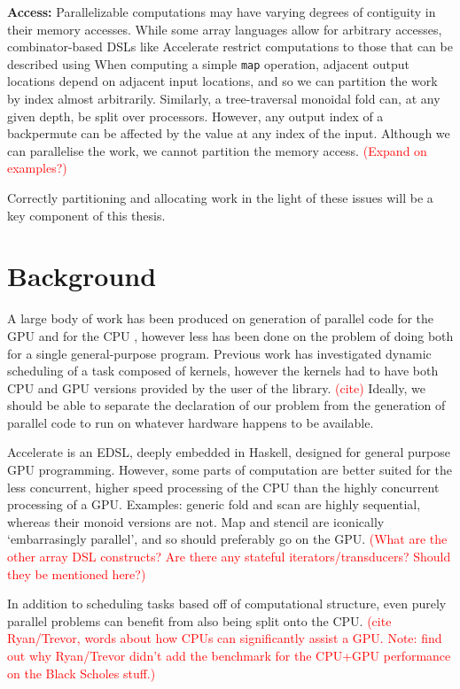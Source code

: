 \documentclass[a4paper,12pt]{article}
\newcommand{\red}[1]{\textcolor{red}{#1}}
\begin{document}
\begin{multicols}{2}
\textbf{Access:} Parallelizable computations may have varying degrees of contiguity in their memory accesses. While some array languages allow for arbitrary accesses, combinator-based DSLs like Accelerate restrict computations to those that can be described using When computing a simple \texttt{map} operation, adjacent output locations depend on adjacent input locations, and so we can partition the work by index almost arbitrarily. Similarly, a tree-traversal monoidal fold can, at any given depth, be split over processors. However, any output index of a backpermute can be affected by the value at any index of the input. Although we can parallelise the work, we cannot partition the memory access. \red{(Expand on examples?)}

Correctly partitioning and allocating work in the light of these issues will be a key component of this thesis.

\section{Background}

A large body of work has been produced on generation of parallel code for the GPU and for the CPU \citep{lee_transparent_2013}, however less has been done on the problem of doing both for a single general-purpose program. Previous work has investigated dynamic scheduling of a task composed of kernels, however the kernels had to have both CPU and GPU versions provided by the user of the library. \red{(cite)} Ideally, we should be able to separate the declaration of our problem from the generation of parallel code to run on whatever hardware happens to be available.

Accelerate is an EDSL, deeply embedded in Haskell, designed for general purpose GPU programming. However, some parts of computation are better suited for the less concurrent, higher speed processing of the CPU than the highly concurrent processing of a GPU. Examples: generic fold and scan are highly sequential, whereas their monoid versions are not. Map and stencil are iconically `embarrasingly parallel', and so should preferably go on the GPU. \red{(What are the other array DSL constructs? Are there any stateful iterators/transducers? Should they be mentioned here?)}

In addition to scheduling tasks based off of computational structure, even purely parallel problems can benefit from also being split onto the CPU. \red{(cite Ryan/Trevor, words about how CPUs can significantly assist a GPU. Note: find out why Ryan/Trevor didn't add the benchmark for the CPU+GPU performance on the Black Scholes stuff.)}


\end{multicols}
\end{document}
